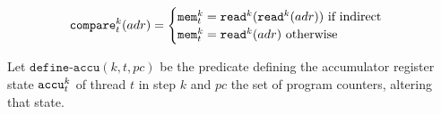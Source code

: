 


\[
\texttt{compare}^k_t(adr) =
\begin{cases}
  \texttt{mem}^k_t = \texttt{read}^k(\texttt{read}^k(adr)) \text{ if indirect} \\
  \texttt{mem}^k_t = \texttt{read}^k(adr) \text{ otherwise}
\end{cases}
\]


Let $\texttt{define-accu}(k, t, pc)$ be the predicate defining the accumulator register state $\texttt{accu}^k_t$ of thread $t$ in step $k$ and $pc$ the set of program counters, altering that state.%

